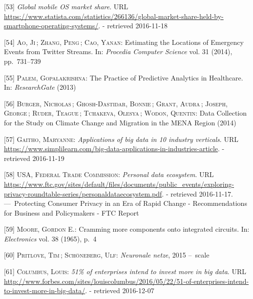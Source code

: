 \documentclass[12pt,english,a4paper,titlepage,cleardoublepage=empty,dottedtoc]{report}
\begin{document}
\hypertarget{ref-graphic_2016_global-mobile-os-market-share}{}
{[}53{]} \emph{Global mobile OS market share}. URL
\url{https://www.statista.com/statistics/266136/global-market-share-held-by-smartphone-operating-systems/}.
- retrieved 2016-11-18

\hypertarget{ref-estimating-the-locations-of-emergency-events-from-twitter-streams_2014}{}
{[}54{]} \textsc{Ao, Ji}\,; \textsc{Zhang, Peng}\,; \textsc{Cao, Yanan}:
Estimating the Locations of Emergency Events from Twitter Streams. In:
\emph{Procedia Computer Science} vol. 31 (2014), pp.~731--739

\hypertarget{ref-the-practice-of-predictive-analytics-in-healthcare_2013}{}
{[}55{]} \textsc{Palem, Gopalakrishna}: The Practice of Predictive
Analytics in Healthcare. In: \emph{ResearchGate} (2013)

\hypertarget{ref-data-collection-for-climate-changes_2014}{}
{[}56{]} \textsc{Burger, Nicholas}\,; \textsc{Ghosh-Dastidar, Bonnie}\,;
\textsc{Grant, Audra}\,; \textsc{Joseph, George}\,; \textsc{Ruder,
Teague}\,; \textsc{Tchakeva, Olesya}\,; \textsc{Wodon, Quentin}: Data
Collection for the Study on Climate Change and Migration in the MENA
Region (2014)

\hypertarget{ref-graphic_2015_applications-of-big-data-in-10-industry-verticals}{}
{[}57{]} \textsc{Gaitho, Maryanne}: \emph{Applications of big data in 10
industry verticals}. URL
\url{https://www.simplilearn.com/big-data-applications-in-industries-article}.
- retrieved 2016-11-19

\hypertarget{ref-graphic_2012_personal-data-ecosystem}{}
{[}58{]} \textsc{USA, Federal Trade Commission}: \emph{Personal data
ecosystem}. URL
\url{https://www.ftc.gov/sites/default/files/documents/public_events/exploring-privacy-roundtable-series/personaldataecosystem.pdf}.
- retrieved 2016-11-17. ---~Protecting Consumer Privacy in an Era of
Rapid Change - Recommendations for Business and Policymakers - FTC
Report

\hypertarget{ref-paper_1965_moors-law}{}
{[}59{]} \textsc{Moore, Gordon E.}: Cramming more components onto
integrated circuits. In: \emph{Electronics} vol. 38 (1965), p.~4

\hypertarget{ref-podcast_2015_cre-neuronale-netze}{}
{[}60{]} \textsc{Pritlove, Tim}\,; \textsc{Schöneberg, Ulf}:
\emph{Neuronale netze}, 2015 --~scale

\hypertarget{ref-web_2016_industries-intention-to-invest-in-big-data}{}
{[}61{]} \textsc{Columbus, Louis}: \emph{51\% of enterprises intend to
invest more in big data}. URL
\url{http://www.forbes.com/sites/louiscolumbus/2016/05/22/51-of-enterprises-intend-to-invest-more-in-big-data/}.
- retrieved 2016-12-07
\end{document}
